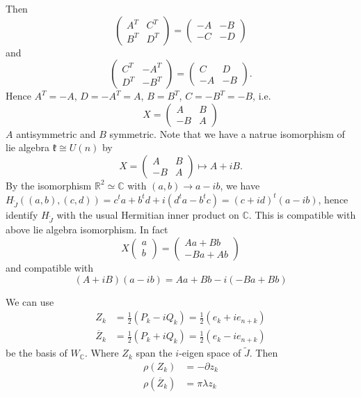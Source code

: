 \documentclass[12pt]{amsart}
\def\bR{{\mathbb{R}}}
\def\bC{{\mathbb{C}}}
\def\tJ{{\widetilde{J}}}
\def\barZ{{\overline{Z}}}
\def\fkk{\mathfrak{k}}
\def\pz#1{\partial z_{#1}}
\begin{document}
Then 
\[
\begin{pmatrix}
A^T & C^T \\
B^T & D^T 
\end{pmatrix} =
\begin{pmatrix}
-A & -B \\
-C & -D 
\end{pmatrix}
\]
and 
\[
\begin{pmatrix}
C^T & -A^T \\
D^T & -B^T 
\end{pmatrix} =
\begin{pmatrix}
C & D \\
-A & -B 
\end{pmatrix}.
\]
Hence $A^T = -A$, $D = -A^T= A$, $B = B^T$, $C = -B^T = -B$,
i.e. 
\[
X = \begin{pmatrix}
A & B\\
-B & A
\end{pmatrix}
\]
$A$ antisymmetric and $B$ symmetric.
Note that we have a natrue isomorphism of lie algebra
$\fkk \cong U(n)$ by 
\[
X = \begin{pmatrix}
A & B\\
-B & A
\end{pmatrix}
\mapsto
A + iB.
\]
By the isomorphism $\bR^2 \simeq \bC$ with $(a,b) \to a-ib$, 
we have $H_\tJ((a,b),(c,d)) = c^ta + b^td +i(d^t a- b^t c)
= (c+id)^t(a-ib)$, hence identify $H_\tJ$ with the usual Hermitian inner
product on $\bC$. This is compatible with above lie algebra isomorphism.
In fact
\[
X\begin{pmatrix}a\\b
\end{pmatrix}
= \begin{pmatrix} Aa+Bb\\
-Ba+ Ab
\end{pmatrix} 
\]
and compatible with
\[
(A+iB)(a-ib) = Aa+Bb -i(-Ba+Bb)
\]

We can use 
\begin{align*}
Z_k  &= \frac{1}{2}(P_k-iQ_k) = \frac{1}{2}(e_k + i e_{n+k})\\
\barZ_k &= \frac{1}{2}(P_k+iQ_k) = \frac{1}{2}(e_k - i e_{n+k})
\end{align*}
be the basis of $W_{\bC}$. Where $Z_k$ span the $i$-eigen space of $\tJ$.
Then 
\begin{align*}
\rho(Z_k) &= -\pz{k} \\
\rho(\barZ_k) & = \pi\lambda z_k
\end{align*}
\end{document}
